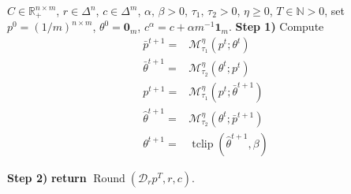 \documentclass[10pt]{article}
\newcommand{\R}{\mathbb{R}}
\newcommand{\diag}[1]{\mathcal{D}_{#1}}
\theoremstyle{plain}
\theoremstyle{definition}
\theoremstyle{remark}
\newcommand{\one}{\mathbf{1}}
\newcommand{\zero}{\mathbf{0}}
\newcommand{\col}{\bm{\mathrm{c}}}
\begin{document}
\begin{minipage}[t]{0.49\linewidth}
\begin{algorithm}[H]\caption{Primal-Dual Mirror Prox}\label{alg:pdmp}
    \begin{algorithmic}
        \REQUIRE $C\in\R_{+}^{n\times m}$, $r\in\Delta^n$, $c\in\Delta^m$, $\alpha,\,\beta>0$, $\tau_1,\,\tau_2>0$, $\eta \geq 0$, $T\in\mathbb{N}>0$, set $p^0=(1/m)^{n\times m}$, $\theta^0=\zero_m$, $c^\alpha=c + \alpha m^{-1}\one_m$.
            \STATE \textbf{Step 1)} Compute
            \begin{align}
                \bar{p}^{t+1}=&\mathcal{M}_{\tau_1}^{\eta }(p^t;\theta^t)\label{step:pdmp_midpoint}\\ \nonumber\bar{\theta}^{t+1}=&\mathcal{M}_{\tau_2}^{\eta }(\theta^t;p^t)\\
                p^{t+1}=&\mathcal{M}_{\tau_1}^{\eta }(p^t;\bar\theta^{t+1}) \label{step:pdmp_main}\\
                \nonumber\hat\theta^{t+1}=&\mathcal{M}_{\tau_2}^{\eta }(\theta^{t};\bar p^{t+1})\\
                \theta^{t+1}=&\operatorname{tclip}(\hat\theta^{t+1},\beta)\label{eq:pdmp_theta_clipping}
            \end{align}
        
            \vspace{-0.5em}
        \ENDFOR
        \STATE \textbf{Step 2)} \textbf{return} $\operatorname{Round}(\diag{r}p^{T}, r, c)$.
    \end{algorithmic}
\end{algorithm}
\end{minipage}
\end{document}
